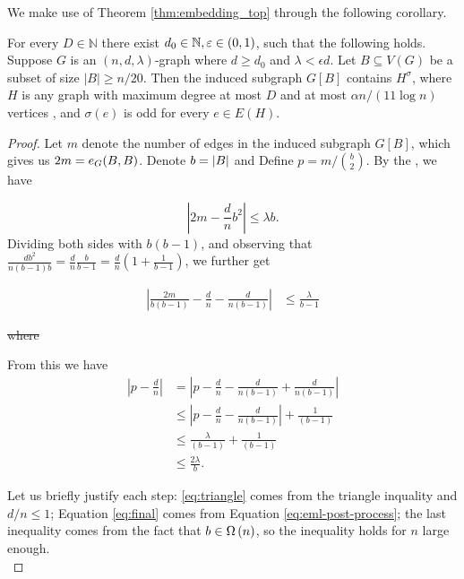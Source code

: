 \documentclass[11pt]{article}
\providecommand{\DIFdel}[1]{\textcolor{verylightgray}{\sout{#1}}}                      %
\providecommand{\DIFdelbegin}{} %
\providecommand{\DIFdelend}{} %
\begin{document}
We make use of Theorem \ref{thm:embedding_top} through the following corollary.

\begin{corollary} 
  For every $D \in \mathbb{N}$ there exist $d_0 \in \Naturals, \epsilon \in (0,1)$, such that the following holds. Suppose $G$ is an $(n,d,\lambda)$-graph where $d \ge d_0$ and $\lambda < \epsilon d$. Let $B \subseteq V(G)$ be a subset of size $|B| \ge n/20$. Then the induced subgraph $G[B]$ contains $H^{\sigma}$, where $H$ is any graph with maximum degree at most $D$ and at most $\alpha n / (11 \log n)$ vertices , and $\sigma(e)$ is odd for every $e \in E(H)$.
\end{corollary}


\begin{proof}
  Let $m$ denote the number of edges in the induced subgraph $G[B]$, which gives us $2m = \CutEdges{B}{B}{G}$.
Denote $b \Def \Size{B}$ and Define $p = m / \binom{b}{2}$. By the , we have

\[ \left| 2m - \frac{d}{n}b^2 \right| \le \lambda b. \]
Dividing both sides with $b(b-1)$, and observing that $\frac{db^2}{n(b-1)b} = \frac{d}{n}\frac{b}{b-1} = \frac{d}{n}(1 + \frac{1}{b-1})$, we further get

\begin{align}
\left| \frac{2m}{b(b-1)} - \frac{d}{n} - \frac{d}{n(b-1)} \right| &\le \frac{\lambda}{b-1}  
\end{align}

\DIFdelbegin \DIFdel{where }\rajko{\DIFdel{where?}}

\DIFdelend From this we have 
\begin{align}
  \left| p - \frac{d}{n}\right| &= \left| p - \frac{d}{n} - \frac{d}{n(b-1)} + \frac{d}{n(b-1)}\right|  \\
                                &\le \left| p - \frac{d}{n} - \frac{d}{n(b-1)} \right| + \frac{1}{(b-1)} \label{eq:triangle}\\
                                &\le \frac{\lambda}{(b-1)} + \frac{1}{(b-1)}  \label{eq:final} \\
  & \le \frac{2\lambda}{b}. 
\end{align}

Let us briefly justify each step: \eqref{eq:triangle} comes from the triangle inquality and  $d/n \le 1$;
Equation \eqref{eq:final} comes from Equation \eqref{eq:eml-post-process};
the last inequality comes from the fact that $b \in \BigOmega{n}$, so the inequality holds for $n$ large enough.\\


\end{proof}
\end{document}
